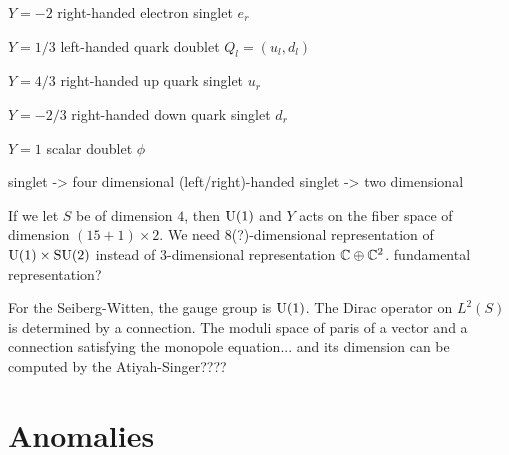 \documentclass{../../large}
\begin{document}
$Y=-2$ right-handed electron singlet $e_r$

$Y=1/3$ left-handed quark doublet $Q_l=(u_l,d_l)$

$Y=4/3$ right-handed up quark singlet $u_r$

$Y=-2/3$ right-handed down quark singlet $d_r$

$Y=1$ scalar doublet $\phi$

singlet -> four dimensional
(left/right)-handed singlet -> two dimensional

If we let $S$ be of dimension $4$, then $\mathrm{U}(1)$ and $Y$ acts on the fiber space of dimension $(15+1)\times2$.
We need $8$(?)-dimensional representation of $\mathrm{U}(1)\times\mathrm{SU}(2)$ instead of $3$-dimensional representation $\mathbb{C}\oplus\mathbb{C}^2$.
fundamental representation?



For the Seiberg-Witten, the gauge group is $\mathrm{U}(1)$.
The Dirac operator on $L^2(S)$ is determined by a connection.
The moduli space of paris of a vector and a connection satisfying the monopole equation... and its dimension can be computed by the Atiyah-Singer????



\chapter{Anomalies}
\end{document}
